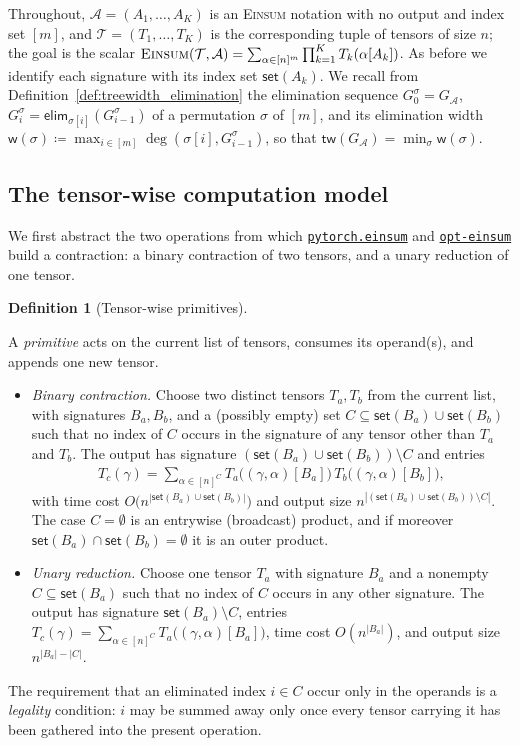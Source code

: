 \documentclass[sn-mathphys, natbib=false]{sn-jnl}
\newcommand{\libref}[2]{\href{#2}{\texttt{#1}}}
\theoremstyle{plain}
\theoremstyle{definition}
\newtheorem{definition}{Definition}
\def\Einsum{\textsc{Einsum}}
\newcommand{\takesetp}[1]{\mathsf{set}(#1)}
\newcommand{\tensorcontraction}{\textsc{Einsum}}
\newcommand{\degp}[2]{\deg(#1,#2)}
\newcommand{\treewidthp}[1]{\mathsf{tw}(#1)}
\newcommand{\less}{O}
\newcommand{\eliminatevg}[2]{\mathsf{elim}_{#1}(#2)}
\newif\ifshowchanges
\newcommand{\rev}[1]{%
  \ifshowchanges
    {\color{red} #1}%
  \else
    #1%
  \fi
}
\newcommand{\torcheinsum}{\libref{pytorch.einsum}{https://pytorch.org/docs/stable/generated/torch.einsum.html}}
\newcommand{\opteinsum}{\libref{opt-einsum}{https://dgasmith.github.io/opt_einsum/}}
\def\calA{\mathcal{A}}
\def\calT{\mathcal{T}}
\begin{document}
\begin{bibunit}[agsm]
\rev{Throughout, $\calA = (A_1, \dots, A_K)$ is an \Einsum{} notation with no output and index set $[m]$, and $\calT = (T_1, \dots, T_K)$ is the corresponding tuple of tensors of size $n$; the goal is the scalar $\tensorcontraction(\calT, \calA) = \sum_{\alpha \in [n]^m} \prod_{k=1}^K T_k(\alpha[A_k])$. As before we identify each signature with its index set $\takesetp{A_k}$. We recall from Definition~\ref{def:treewidth_elimination} the elimination sequence $G^\sigma_0 = G_\calA$, $G^\sigma_i = \eliminatevg{\sigma[i]}{G^\sigma_{i-1}}$ of a permutation $\sigma$ of $[m]$, and its elimination width $\mathsf{w}(\sigma) \coloneqq \max_{i \in [m]} \degp{\sigma[i]}{G^\sigma_{i-1}}$, so that $\treewidthp{G_\calA} = \min_\sigma \mathsf{w}(\sigma)$.}

\subsection{The tensor-wise computation model}

\rev{We first abstract the two operations from which \torcheinsum{} and \opteinsum{} build a contraction: a binary contraction of two tensors, and a unary reduction of one tensor.}

\begin{definition}[Tensor-wise primitives]
\label{def:tw_primitives}
\rev{A \emph{primitive} acts on the current list of tensors, consumes its operand(s), and appends one new tensor.
\begin{itemize}
\item[\textnormal{(P1)}] \emph{Binary contraction.} Choose two distinct tensors $T_a, T_b$ from the current list, with signatures $B_a, B_b$, and a (possibly empty) set $C \subseteq \takesetp{B_a} \cup \takesetp{B_b}$ such that no index of $C$ occurs in the signature of any tensor other than $T_a$ and $T_b$. The output has signature $(\takesetp{B_a} \cup \takesetp{B_b}) \setminus C$ and entries
\begin{align*}
T_c(\gamma) = \sum_{\alpha \in [n]^{C}} T_a\big((\gamma, \alpha)[B_a]\big)\, T_b\big((\gamma, \alpha)[B_b]\big),
\end{align*}
with time cost $\less\!\big(n^{|\takesetp{B_a} \cup \takesetp{B_b}|}\big)$ and output size $n^{|(\takesetp{B_a} \cup \takesetp{B_b}) \setminus C|}$. The case $C = \emptyset$ is an entrywise (broadcast) product, and if moreover $\takesetp{B_a} \cap \takesetp{B_b} = \emptyset$ it is an outer product.
\item[\textnormal{(P2)}] \emph{Unary reduction.} Choose one tensor $T_a$ with signature $B_a$ and a nonempty $C \subseteq \takesetp{B_a}$ such that no index of $C$ occurs in any other signature. The output has signature $\takesetp{B_a} \setminus C$, entries $T_c(\gamma) = \sum_{\alpha \in [n]^C} T_a\big((\gamma, \alpha)[B_a]\big)$, time cost $\less(n^{|B_a|})$, and output size $n^{|B_a| - |C|}$.
\end{itemize}
The requirement that an eliminated index $i \in C$ occur only in the operands is a \emph{legality} condition: $i$ may be summed away only once every tensor carrying it has been gathered into the present operation.}
\end{definition}


\end{bibunit}
\end{document}
